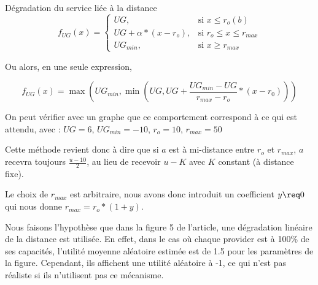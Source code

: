 \begin{hypothese}{Dégradation du service liée à la distance}
$$ f_{UG}(x)= 
\begin{cases}
    UG,                 & \text{si } x \leq r_o(b)\\
    UG + \alpha * (x - r_o),  & \text{si } r_o \leq x \leq r_{max}\\
    UG_{min},  & \text{si } x \geq r_{max}
\end{cases} $$

Ou alors, en une seule expression, 

$$ f_{UG}(x) = \max(UG_{min}, \min(UG, UG + \dfrac{UG_{min} - UG}{r_{max} - r_o} * (x - r_0))) $$

On peut vérifier avec un graphe que ce comportement correspond à ce qui est attendu, avec : $UG = 6$, $UG_{min} = -10$, $r_o = 10$, $r_{max} = 50$\newline


\begin{center}
\end{center}

\noindent Cette méthode revient donc à dire que si $a$ est à mi-distance entre $r_o$ et $r_{max}$, $a$ recevra toujours $\frac{u - 10}{2}$, au lieu de recevoir $u - K$ avec $K$ constant (à distance fixe).\newline

Le choix de $r_{max}$ est arbitraire, nous avons donc introduit un coefficient $y \req 0$ qui nous donne $r_{max} = r_o * (1 + y)$.\newline

\greysep



Nous faisons l'hypothèse que dans la figure 5 de l'article, une dégradation linéaire de la distance est utilisée. En effet, dans le cas où chaque provider est à 100\% de ses capacités, l'utilité moyenne aléatoire estimée est de 1.5 pour les paramètres de la figure. Cependant, ils affichent une utilité aléatoire à -1, ce qui n'est pas réaliste si ils n'utilisent pas ce mécanisme.


\end{hypothese}


\begin{hypothese}
    
\end{hypothese}

\vspace{10pt}

